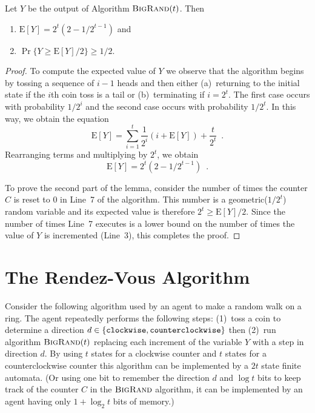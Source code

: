 \documentclass[lotsofwhite]{patmorin}
\newcommand{\bigrand}{\textsc{BigRand}}
\newcommand{\E}{\mathrm{E}}
\begin{document}
\begin{lem}
Let $Y$ be the output of Algorithm $\bigrand(t)$.  Then 
\begin{enumerate}
\item $\E[Y]=2^t(2-1/2^{t-1})$ and
\item $\Pr\{Y \ge \E[Y] / 2\} \ge 1/2$.
\end{enumerate}
\end{lem}

\begin{proof}
To compute the expected value of $Y$ we observe that the algorithm
begins by tossing a sequence of $i-1$ heads and then either
(a)~returning to the initial state if the $i$th coin toss is a tail
or (b)~terminating if $i=2^t$.  The first case occurs with probability
$1/2^i$ and the second case occurs with probability $1/2^t$.
In this way, we obtain the equation
\[
   \E[Y] = \sum_{i=1}^{t} \frac{1}{2^i}\left(i + \E[Y]\right) +
\frac{t}{2^t} \enspace .
\]
Rearranging terms and multiplying by $2^{t}$, we obtain
\[
   \E[Y] = 2^t(2-1/2^{t-1}) \enspace .  
\]

To prove the second part of the lemma, consider the number of times
the counter $C$ is reset to $0$ in Line~7 of the algorithm.  This
number is a geometric($1/2^t$) random variable and its expected value
is therefore $2^t \ge \E[Y]/2$.  Since the number of times Line~7
executes is a lower bound on the number of times the value of $Y$ is
incremented (Line~3), this completes the proof.
\end{proof}

\section{The Rendez-Vous Algorithm}

Consider the following algorithm used by an agent to make a random
walk on a ring.  The agent repeatedly performs the following steps:
(1)~toss a coin to determine a direction
$d\in\{\mbox{{\tt clockwise}},\mbox{{\tt counterclockwise}}\}$ then (2)~run
algorithm $\bigrand(t)$ replacing each increment of the variable
$Y$ with a step in direction $d$.  By using  $t$ states for 
a clockwise counter and $t$ states for a counterclockwise counter this algorithm
can be implemented by a $2t$ state finite automata. (Or using 
one bit to remember the
direction $d$ and $\log t$ bits to keep track of the counter $C$ in the
$\bigrand$ algorithm, it can be implemented by an agent
having only $1+\log_2 t$ bits of memory.) 
\end{document}
